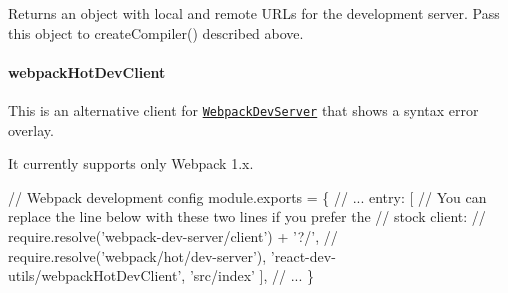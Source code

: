 Returns an object with local and remote U\+R\+Ls for the development server. Pass this object to {\ttfamily create\+Compiler()} described above.

\paragraph*{{\ttfamily webpack\+Hot\+Dev\+Client}}

This is an alternative client for \href{https://github.com/webpack/webpack-dev-server}{\tt Webpack\+Dev\+Server} that shows a syntax error overlay.

It currently supports only Webpack 1.\+x.


\begin{DoxyCode}
// Webpack development config
module.exports = \{
  // ...
  entry: [
    // You can replace the line below with these two lines if you prefer the
    // stock client:
    // require.resolve('webpack-dev-server/client') + '?/',
    // require.resolve('webpack/hot/dev-server'),
    'react-dev-utils/webpackHotDevClient',
    'src/index'
  ],
  // ...
\}
\end{DoxyCode}
 